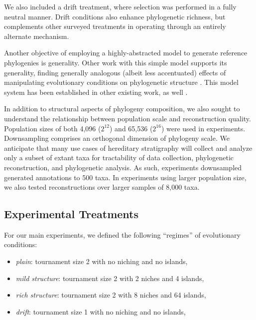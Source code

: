 We also included a drift treatment, where selection was performed in a fully neutral manner.
Drift conditions also enhance phylogenetic richness, but complements other surveyed treatments in operating through an entirely alternate mechanism.

Another objective of employing a highly-abstracted model to generate reference phylogenies is generality.
Other work with this simple model supports its generality, finding generally analogous (albeit less accentuated) effects of manipulating evolutionary conditions on phylogenetic structure \citep{moreno2024ecology}.
This model system has been established in other existing work, as well \citep{moreno2023toward}.

In addition to structural aspects of phylogeny composition, we also sought to understand the relationship between population scale and reconstruction quality.
Population sizes of both 4,096 ($2^{12}$) and 65,536 ($2^{16}$) were used in experiments.
Downsampling comprises an orthogonal dimension of phylogeny scale.
We anticipate that many use cases of hereditary stratigraphy will collect and analyze only a subset of extant taxa for tractability of data collection, phylogenetic reconstruction, and phylogenetic analysis.
As such, experiments downsampled generated annotations to 500 taxa.
In experiments using larger population size, we also tested reconstructions over larger samples of 8,000 taxa.

\subsection{Experimental Treatments}

For our main experiments, we defined the following ``regimes'' of evolutionary conditions:
\begin{itemize}
  \item \textit{plain}: tournament size 2 with no niching and no islands,
  \item \textit{mild structure}: tournament size 2 with 2 niches and 4 islands,
  \item \textit{rich structure}: tournament size 2 with 8 niches and 64 islands,
  \item \textit{drift}: tournament size 1 with no niching and no islands,
\end{itemize}



